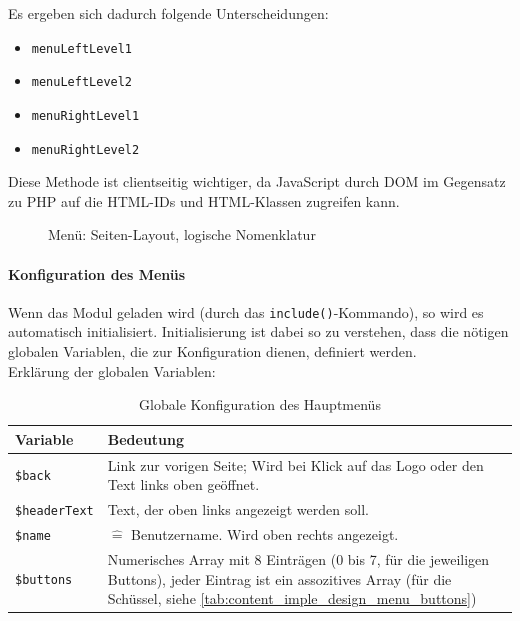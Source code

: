 Es ergeben sich dadurch folgende Unterscheidungen:
\begin{itemize}
	\item \texttt{menuLeftLevel1}
	\item \texttt{menuLeftLevel2}
	\item \texttt{menuRightLevel1}
	\item \texttt{menuRightLevel2}
\end{itemize}
Diese Methode ist clientseitig wichtiger, da JavaScript durch DOM im Gegensatz zu PHP auf die HTML-IDs und HTML-Klassen zugreifen kann.
\begin{figure}[H]
\centering
{}
\caption{Menü: Seiten-Layout, logische Nomenklatur}
\label{fig:content_imple_menu_layout2}
\end{figure}

\paragraph{Konfiguration des Menüs\\}
Wenn das Modul geladen wird (durch das \texttt{include()}-Kommando), so wird es automatisch initialisiert. Initialisierung ist dabei so zu verstehen, dass die nötigen globalen Variablen, die zur Konfiguration dienen, definiert werden.\\

Erklärung der globalen Variablen:\\
\begin{table}[H]
\centering
\begin{tabular}{p{2.5 cm}p{11 cm}}
	\toprule
		\textbf{Variable} & \textbf{Bedeutung} \\
	\midrule
		\texttt{\$back} & Link zur vorigen Seite; Wird bei Klick auf das Logo oder den Text links oben geöffnet.\\
		\hline
		\texttt{\$headerText} & Text, der oben links angezeigt werden soll.\\
		\hline
		\texttt{\$name} & $ \widehat{=} $ Benutzername. Wird oben rechts angezeigt.\\
		\hline
		\texttt{\$buttons} & Numerisches Array mit 8 Einträgen (0 bis 7, für die jeweiligen Buttons), jeder Eintrag ist ein assozitives Array (für die Schüssel, siehe \autoref{tab:content_imple_design_menu_buttons})\\
	\bottomrule
\end{tabular}
\caption{Globale Konfiguration des Hauptmenüs}
\label{tab:content_imple_design_menu_global}
\end{table}

